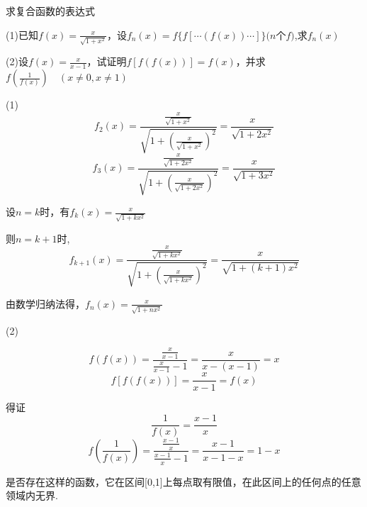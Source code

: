 \begin{exercise}
    求复合函数的表达式

    (1)已知$f(x)=\frac{x}{\sqrt{1+x^2}}$，设$f_n(x)=f\{f[\cdots (f(x)) \cdots]\}(n$个$f)$,求$f_n(x)$

    (2)设$f(x)=\frac{x}{x-1}$，试证明$f[f(f(x))]=f(x)$，并求$f(\frac{1}{f(x)})\quad (x\ne 0,x\ne 1)$
\end{exercise}

\begin{solution}

    (1)
    \begin{equation*}
        f_2(x)=\frac{\frac{x}{\sqrt{1+x^2}}}{\sqrt{1+(\frac{x}{\sqrt{1+x^2}})^2}} = \frac{x}{\sqrt{1 + 2 x^2}}
    \end{equation*}
    \begin{equation*}
        f_3(x)=\frac{\frac{x}{\sqrt{1+2x^2}}}{\sqrt{1+(\frac{x}{\sqrt{1+2x^2}})^2}} = \frac{x}{\sqrt{1 + 3 x^2}}
    \end{equation*}

    设$n=k$时，有$f_k(x)=\frac{x}{\sqrt{1 + k x^2}}$

    则$n=k+1$时,\begin{equation*}
        f_{k+1}(x)=\frac{\frac{x}{\sqrt{1+kx^2}}}{\sqrt{1+(\frac{x}{\sqrt{1+kx^2}})^2}} = \frac{x}{\sqrt{1 + (k+1) x^2}}
    \end{equation*}

    由数学归纳法得，$f_n(x)=\frac{x}{\sqrt{1 + n x^2}}$

    (2)

    \begin{equation*}
        f(f(x)) = \frac{\frac{x}{x-1}}{\frac{x}{x-1}-1} = \frac{x}{x-(x-1)} = x
    \end{equation*}
    \begin{equation*}
        f[f(f(x))] = \frac{x}{x-1} = f(x)
    \end{equation*}

    得证
    \begin{equation*}
        \frac{1}{f(x)} = \frac{x-1}{x}
    \end{equation*}
    \begin{equation*}
        f(\frac{1}{f(x)}) = \frac{\frac{x-1}{x}}{\frac{x-1}{x}-1} = \frac{x-1}{x-1-x} = 1-x
    \end{equation*}
\end{solution}

\begin{exercise}
    是否存在这样的函数，它在区间[0,1]上每点取有限值，在此区间上的任何点的任意领域内无界.
\end{exercise}

